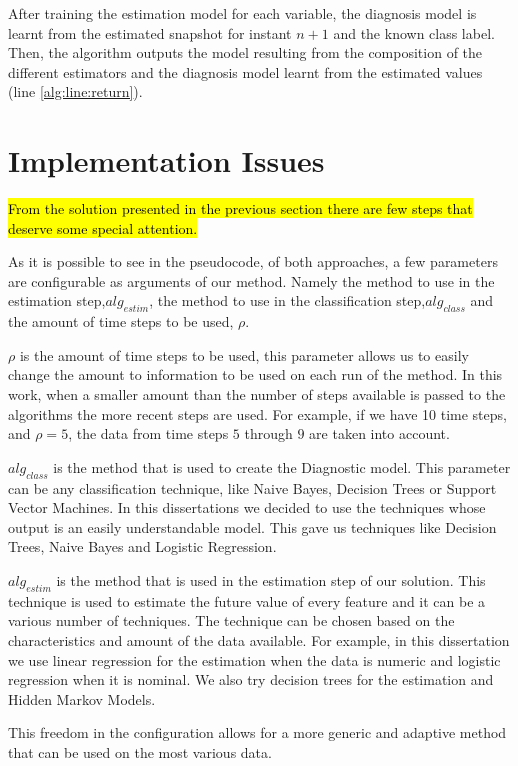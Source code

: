 After training the estimation model for each variable, the diagnosis model is learnt from the estimated snapshot for instant
 $n+1$ and the known class label. Then, the algorithm outputs the model resulting from the composition of the different
 estimators and the diagnosis model learnt from the estimated values (line \ref{alg:line:return}).

\section{Implementation Issues}
\label{section:implementation}

\hl{From the solution presented in the previous section there are few steps that deserve some special attention. }

As it is possible to see in the pseudocode, of both approaches, a few parameters are configurable as arguments of our method. Namely the method to use in the estimation step,$alg_{estim}$, the method to use in the classification step,$alg_{class}$ and the amount of time steps to be used, $\rho$. 

$\rho$ is the amount of time steps to be used, this parameter allows us to easily change the amount to information to be used on each run of the method. In this work, when a smaller amount than the number of steps available is passed to the algorithms the more recent steps are used. For example, if we have 10 time steps, and $\rho = 5$, the data from time steps $5$ through $9$ are taken into account.

$alg_{class}$ is the method that is used to create the Diagnostic model. This parameter can be any classification technique, like Naive Bayes, Decision Trees or Support Vector Machines. In this dissertations we decided to use the techniques whose output is an easily understandable model. This gave us techniques like Decision Trees, Naive Bayes and Logistic Regression. 

$alg_{estim}$ is the method that is used in the estimation step of our solution. This technique is used to estimate the future value of every feature and it can be a various number of techniques. The technique can be chosen based on the characteristics and amount of the data available. For example, in this dissertation we use linear regression for the estimation when the data is numeric and logistic regression when it is nominal. We also try decision trees for the estimation and Hidden Markov Models.

This freedom in the configuration allows for a more generic and adaptive method that can be used on the most various data.

